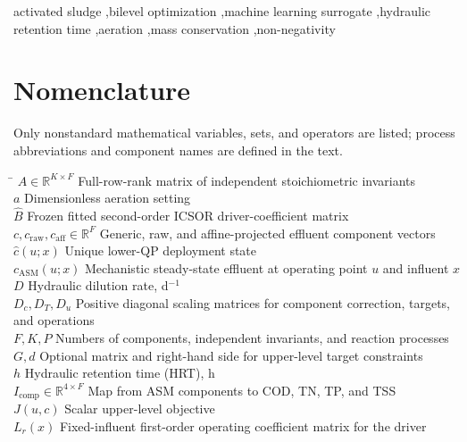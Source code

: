 \documentclass[a4paper,fleqn]{cas-sc}
\newcommand{\R}{\mathbb{R}}
\begin{document}
\begin{keywords}
activated sludge \sep bilevel optimization \sep machine learning surrogate \sep hydraulic retention time \sep aeration \sep mass conservation \sep non-negativity
\end{keywords}

\maketitle

\section*{Nomenclature}
\noindent Only nonstandard mathematical variables, sets, and operators are listed; process abbreviations and component names are defined in the text.
\begin{tabbing}
\hspace{4.2cm} \= \kill
$A\in\R^{K\times F}$ \> Full-row-rank matrix of independent stoichiometric invariants \\
$a$ \> Dimensionless aeration setting \\
$\widehat B$ \> Frozen fitted second-order ICSOR driver-coefficient matrix \\
$c,c_{\mathrm{raw}},c_{\mathrm{aff}}\in\R^F$ \> Generic, raw, and affine-projected effluent component vectors \\
$\widehat c(u;x)$ \> Unique lower-QP deployment state \\
$c_{\mathrm{ASM}}(u;x)$ \> Mechanistic steady-state effluent at operating point $u$ and influent $x$ \\
$D$ \> Hydraulic dilution rate, d$^{-1}$ \\
$D_c,D_T,D_u$ \> Positive diagonal scaling matrices for component correction, targets, and operations \\
$F,K,P$ \> Numbers of components, independent invariants, and reaction processes \\
$G,d$ \> Optional matrix and right-hand side for upper-level target constraints \\
$h$ \> Hydraulic retention time (HRT), h \\
$I_{\mathrm{comp}}\in\R^{4\times F}$ \> Map from ASM components to COD, TN, TP, and TSS \\
$J(u,c)$ \> Scalar upper-level objective \\
$L_r(x)$ \> Fixed-influent first-order operating coefficient matrix for the driver \\

\end{tabbing}
\end{document}
